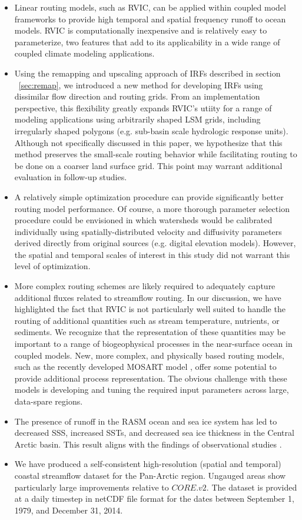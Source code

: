 \documentclass[jgrga, draft]{agutex}
\begin{document}
\begin{article}
\begin{itemize}[leftmargin=+.5in]
  \item Linear routing models, such as RVIC, can be applied within coupled model frameworks to provide high temporal and spatial frequency runoff to ocean models.
  RVIC is computationally inexpensive and is relatively easy to parameterize, two features that add to its applicability in a wide range of coupled climate modeling applications.
  \item Using the remapping and upscaling approach of IRFs described in section ~\ref{sec:remap}, we introduced a new method for developing IRFs using dissimilar flow direction and routing grids.
  From an implementation perspective, this flexibility greatly expands RVIC's utiity for a range of modeling applications using arbitrarily shaped LSM grids, including irregularly shaped polygons (e.g. sub-basin scale hydrologic response units).
  Although not specifically discussed in this paper, we hypothesize that this method preserves the small-scale routing behavior while facilitating routing to be done on a coarser land surface grid.
  This point may warrant additional evaluation in follow-up studies.
  \item A relatively simple optimization procedure can provide significantly better routing model performance.
  Of course, a more thorough parameter selection procedure could be envisioned in which watersheds would be calibrated individually using spatially-distributed velocity and diffusivity parameters derived directly from original sources (e.g. digital elevation models).
  However, the spatial and temporal scales of interest in this study did not warrant this level of optimization.
  \item More complex routing schemes are likely required to adequately capture additional fluxes related to streamflow routing.
  In our discussion, we have highlighted the fact that RVIC is not particularly well suited to handle the routing of additional quantities such as stream temperature, nutrients, or sediments.
  We recognize that the representation of these quantities may be important to a range of biogeophysical processes in the near-surface ocean in coupled models.
  New, more complex, and physically based routing models, such as the recently developed MOSART model \citep{Li_2013}, offer some potential to provide additional process representation.
  The obvious challenge with these models is developing and tuning the required input parameters across large, data-spare regions.
  \item The presence of runoff in the RASM ocean and sea ice system has led to decreased SSS, increased SSTs, and decreased sea ice thickness in the Central Arctic basin.
  This result aligns with the findings of observational studies \citep[e.g.][]{Morison_2012}.
  \item We have produced a self-consistent high-resolution (spatial and temporal) coastal streamflow dataset for the Pan-Arctic region.
  Ungauged areas show particularly large improvements relative to $CORE.v2$.
  The dataset is provided at a daily timestep in netCDF file format for the dates between September 1, 1979, and December 31, 2014.
\end{itemize}


\end{article}
\end{document}
